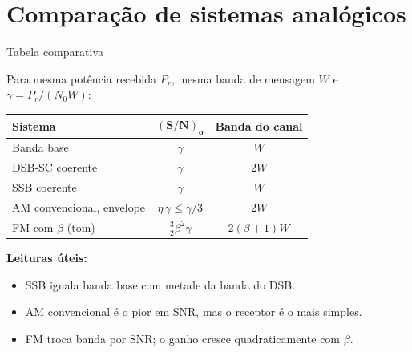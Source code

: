 
\section{Comparação de sistemas analógicos}

\begin{frame}{Tabela comparativa}

Para mesma potência recebida $P_r$, mesma banda de mensagem $W$ e $\gamma = P_r/(N_0 W)$:

\begin{center}
\small
\begin{tabular}{|l|c|c|}
\hline
\textbf{Sistema} & $\boldsymbol{(S/N)_o}$ & \textbf{Banda do canal} \\
\hline
Banda base & $\gamma$ & $W$ \\
\hline
DSB-SC coerente & $\gamma$ & $2W$ \\
\hline
SSB coerente & $\gamma$ & $W$ \\
\hline
AM convencional, envelope & $\eta\,\gamma \le \gamma/3$ & $2W$ \\
\hline
FM com $\beta$ (tom) & $\tfrac{3}{2}\beta^2 \gamma$ & $2(\beta+1)W$ \\
\hline
\end{tabular}
\end{center}

\vspace{0.3cm}

\textbf{Leituras úteis:}
\begin{itemize}
\item SSB iguala banda base com metade da banda do DSB.
\item AM convencional é o pior em SNR, mas o receptor é o mais simples.
\item FM troca banda por SNR; o ganho cresce quadraticamente com $\beta$.
\end{itemize}

\end{frame}


